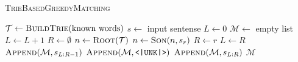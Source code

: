 \begin{algorithm}
	\caption{\textsc{TrieBasedGreedyMatching}}
    \label{alg:TrieBasedGreedyMatching}
	\begin{algorithmic}
        \State $\mathcal{T} \leftarrow \textsc{BuildTrie}(\text{known words})$
        \State $s\leftarrow$ input sentense
        \State $L \leftarrow 0$
        \State $\mathcal{M} \leftarrow$ empty list
            \State $L\leftarrow L + 1$
            \EndWhile
            \State $R \leftarrow \emptyset$
            \State $n \leftarrow \textsc{Root}(\mathcal{T})$
            \For{$r\in [L, \textsc{Length}(s)) \land \textsc{Son}(n, s_r)\neq \emptyset$}
                \State $n\leftarrow \textsc{Son}(n, s_r)$
                    \State $R\leftarrow r$
                \EndIf
            \EndFor
            \State $L\leftarrow R$
            \State $\textsc{Append}(\mathcal{M}, s_{L:R-1})$
            \State $\textsc{Append}(\mathcal{M}, \texttt{<|UNK|>})$
            \Else
            \State $\textsc{Append}(\mathcal{M}, s_{L:R})$
            \EndIf
        \EndWhile
        \State \Return $\mathcal{M}$
	\end{algorithmic} 
\end{algorithm}


